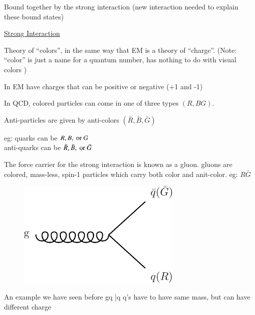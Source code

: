 {Bound together by the strong interaction (new interaction needed to explain these bound states) 

\underline{Strong Interaction} 

Theory of ``colors'', in the same way that EM is a theory of ``charge''. 
(Note: ``color'' is just a name for a quantum number, has nothing to do with visual colors ) 

In EM have charges that can be positive or negative (+1 and -1) 

In QCD, colored particles can come in one of three types $(R, B G)$. 

Anti-particles are given by anti-colors $(\bar{R}, \bar{B}, \bar{G})$ 

\begin{center}
eg: quarks can be $R, B, \textrm{ or } G$ \\
anti-quarks can be $\bar{R}, \bar{B}, \textrm{ or } \bar{G}$
\end{center}

The force carrier for the strong interaction is known as a gluon. 
gluons are colored, mass-less, spin-1 particles which carry both color and anit-color. eg: $R\bar{G}$

\hspace*{1in}

\begin{minipage}{0.4\textwidth}
\begin{figure}[H]
\centering
\includegraphics[width=0.7\textwidth]{./gluonVertex.pdf} 
\end{figure}
\end{minipage} \hfill
\begin{minipage}{0.45\textwidth}
An example we have seen before
\be
g\rightarrow q \bar{q}
\ee
q's have to have same mass, but can have different charge
\end{minipage}

\clearpage

}
